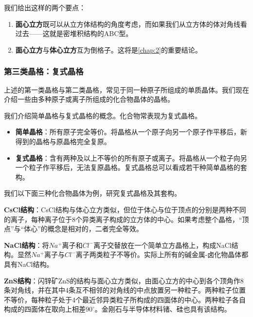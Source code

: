     我们给出这样的两个要点：
    \begin{enumerate}[itemsep=0pt,parsep=0pt]
        \item \textbf{面心立方}既可以从立方体结构的角度考虑，而如果我们从立方体的体对角线看过去——这就是密堆积结构的ABC型。
        \item \textbf{面心立方}与\textbf{体心立方}互为倒格子。这将是\autoref{chap:2}的重要结论。
    \end{enumerate}

\subsubsection{第三类晶格：复式晶格}
    上述的第一类晶格与第二类晶格，常见于同一种原子所组成的单质晶体。我们现在介绍一些由多种原子或离子所组成的化合物晶体的晶格。

    我们介绍简单晶格与复式晶格的概念。化合物常表现为复式晶格。
    \begin{itemize}[itemsep=0pt,parsep=0pt]
        \item \textbf{简单晶格}：所有原子完全等价。将晶格从一个原子向另一个原子作平移后，新得到的晶格与原晶格完全复原。
        \item \textbf{复式晶格}：含有两种及以上不等价的所有原子或离子。将晶格从一个粒子向另一个粒子作平移后，无法复原晶格。复式晶格总可以看成若干种简单晶格的套构。
    \end{itemize}

    我们以下面三种化合物晶体为例，研究复式晶格及其套构。

    \textbf{CsCl结构}：CsCl结构与体心立方类似，但位于体心与位于顶点的分别是两种不同的离子，每种离子位于8个异类离子构成的立方体的中心。如果考虑整个晶格，“顶点”与“体心”的概念是相对的，二者完全等效。

    \textbf{NaCl结构}：将$Na^+$离子和$Cl^-$离子交替放在一个简单立方晶格上，构成NaCl结构。显然$Na^+$离子与$Cl^-$离子两类粒子不等价。实际上所有的碱金属-卤化物晶体都具有NaCl结构。

    \textbf{ZnS结构}：闪锌矿ZnS的结构与面心立方类似，由面心立方的中心到各个顶角作8条对角线，并在其中4条互不相邻的对角线的中点放置另一种粒子。两种粒子位置不等价，每种粒子处于4个最近邻异类粒子所构成的四面体的中心。两种粒子各自构成的四面体在取向上相差$90^{\circ}$。金刚石与半导体材料锗、硅也具有该结构。

